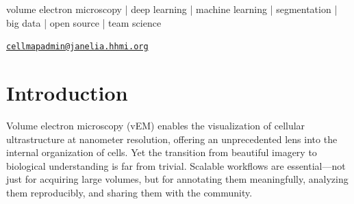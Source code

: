 \documentclass[times, twoside]{zHenriquesLab-StyleBioRxiv}
\begin{document}
\begin{abstract}
Large-scale, high-resolution imaging of subcellular architecture using volume electron microscopy (vEM) unlocks new opportunities for biological discovery—but realizing this potential requires more than just data acquisition. Scalable infrastructure, robust protocols, and trained personnel are critical to extract consistent insight from these complex datasets and make them useful to the broader community. The CellMap Project Team represents a coordinated effort to scale vEM-based segmentation across six dimensions: dataset scale, biological diversity, organelle classification complexity, team training, analytical depth, and open access. Through modular training programs, systematic quality control, and block-wise processing tools, the project has grown from individual cell volumes to tissue-scale annotation across dozens of organisms and sample types. Annotated datasets are openly shared through OpenOrganelle, providing the community with immediate access to high-resolution volumes and voxel-level segmentations. We describe how workflows and infrastructure evolved to support this scaling effort, with a focus on designing datasets that are tailored for specific biological insight yet structured for broad reuse. By scaling people, protocols, and pipelines in parallel—and committing to open data practices—the CellMap Project Team provides a model for reproducible, high-resolution cellular mapping at scale.
\end{abstract}

\begin{keywords}
volume electron microscopy | deep learning | machine learning | segmentation | big data | open source | team science
\end{keywords}

\begin{corrauthor}

\texttt{\href{mailto:cellmapadmin@janelia.hhmi.org}{cellmapadmin@janelia.hhmi.org}}
\end{corrauthor}

\section*{Introduction}

Volume electron microscopy (vEM) enables the visualization of cellular ultrastructure at nanometer resolution, offering an unprecedented lens into the internal organization of cells. Yet the transition from beautiful imagery to biological understanding is far from trivial. Scalable workflows are essential—not just for acquiring large volumes, but for annotating them meaningfully, analyzing them reproducibly, and sharing them with the community.
\end{document}
